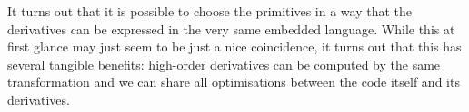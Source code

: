 It turns out that it is possible to choose the primitives in a way that the derivatives 
can be expressed in the very same embedded language. 
While this at first glance may just seem to be just a nice coincidence, it turns out
that this has several tangible benefits: high-order derivatives can be computed 
by the same transformation and we can share all optimisations between the code itself
and its derivatives.
\begin{code}[hide]%
\>[0]\AgdaSpace{}%
\AgdaSpace{}%
\<%
\\
\>[0][@{}l@{\AgdaIndent{0}}]%
\>[2]\AgdaSpace{}%
\AgdaSpace{}%
\AgdaSpace{}%
\AgdaSymbol{(}\AgdaSymbol{;}\AgdaSpace{}%
\AgdaSymbol{;}\AgdaSpace{}%
\AgdaSymbol{)}\<%
\\
%
\>[2]\AgdaSpace{}%
\AgdaSpace{}%
\AgdaSpace{}%
\AgdaSpace{}%
\AgdaSymbol{(}\AgdaSymbol{;}\AgdaSpace{}%
\AgdaSymbol{;}\AgdaSpace{}%
\AgdaSymbol{)}\<%
\\
%
\>[2]\AgdaSpace{}%
\AgdaSpace{}%
\<%
\end{code}

